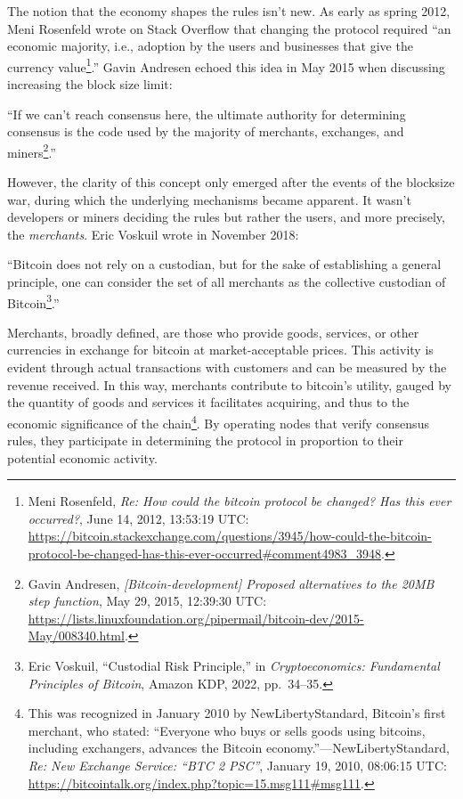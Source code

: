 \documentclass[
  a5paper,
  smalldemyvopaper,10pt,twoside,onecolumn,openright,extrafontsizes,hidelinks]{memoir}
\begin{document}
The notion that the economy shapes the rules isn't new. As early as
spring 2012, Meni Rosenfeld wrote on Stack Overflow that changing the
protocol required ``an economic majority, i.e., adoption by the users
and businesses that give the currency value\footnote{Meni Rosenfeld,
  \emph{Re: How could the bitcoin protocol be changed? Has this ever
  occurred?}, June 14, 2012, 13:53:19 UTC:
  \url{https://bitcoin.stackexchange.com/questions/3945/how-could-the-bitcoin-protocol-be-changed-has-this-ever-occurred\#comment4983_3948}.}.''
Gavin Andresen echoed this idea in May 2015 when discussing increasing
the block size limit:

``If we can't reach consensus here, the ultimate authority for
determining consensus is the code used by the majority of merchants,
exchanges, and miners\footnote{Gavin Andresen,
  \emph{{[}Bitcoin-development{]} Proposed alternatives to the 20MB step
  function}, May 29, 2015, 12:39:30 UTC:
  \url{https://lists.linuxfoundation.org/pipermail/bitcoin-dev/2015-May/008340.html}.}.''

However, the clarity of this concept only emerged after the events of
the blocksize war, during which the underlying mechanisms became
apparent. It wasn't developers or miners deciding the rules but rather
the users, and more precisely, the \emph{merchants}. Eric Voskuil wrote
in November 2018:

``Bitcoin does not rely on a custodian, but for the sake of establishing
a general principle, one can consider the set of all merchants as the
collective custodian of Bitcoin\footnote{Eric Voskuil, ``Custodial Risk
  Principle,'' in \emph{Cryptoeconomics: Fundamental Principles of
  Bitcoin}, Amazon KDP, 2022, pp.~34--35.}.''

Merchants, broadly defined, are those who provide goods, services, or
other currencies in exchange for bitcoin at market-acceptable prices.
This activity is evident through actual transactions with customers and
can be measured by the revenue received. In this way, merchants
contribute to bitcoin's utility, gauged by the quantity of goods and
services it facilitates acquiring, and thus to the economic significance
of the chain\footnote{This was recognized in January 2010 by
  NewLibertyStandard, Bitcoin's first merchant, who stated: ``Everyone
  who buys or sells goods using bitcoins, including exchangers, advances
  the Bitcoin economy.''---NewLibertyStandard, \emph{Re: New Exchange
  Service: ``BTC 2 PSC''}, January 19, 2010, 08:06:15 UTC:
  \url{https://bitcointalk.org/index.php?topic=15.msg111\#msg111}.}. By
operating nodes that verify consensus rules, they participate in
determining the protocol in proportion to their potential economic
activity.
\end{document}
